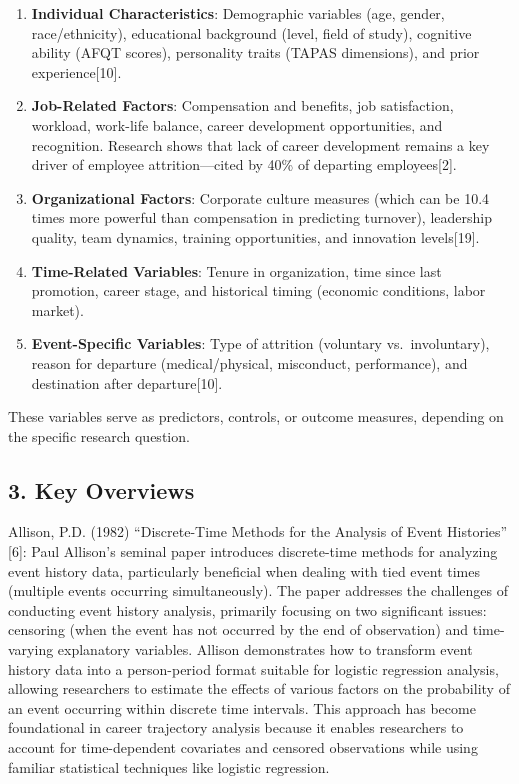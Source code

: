 \documentclass[./main.tex]{subfiles}
\begin{document}
\begin{enumerate}
\def\labelenumi{\arabic{enumi}.}
\item
  \textbf{Individual Characteristics}: Demographic variables (age,
  gender, race/ethnicity), educational background (level, field of
  study), cognitive ability (AFQT scores), personality traits (TAPAS
  dimensions), and prior experience{[}10{]}.
\item
  \textbf{Job-Related Factors}: Compensation and benefits, job
  satisfaction, workload, work-life balance, career development
  opportunities, and recognition. Research shows that lack of career
  development remains a key driver of employee attrition---cited by 40\%
  of departing employees{[}2{]}.
\item
  \textbf{Organizational Factors}: Corporate culture measures (which can
  be 10.4 times more powerful than compensation in predicting turnover),
  leadership quality, team dynamics, training opportunities, and
  innovation levels{[}19{]}.
\item
  \textbf{Time-Related Variables}: Tenure in organization, time since
  last promotion, career stage, and historical timing (economic
  conditions, labor market).
\item
  \textbf{Event-Specific Variables}: Type of attrition (voluntary
  vs.~involuntary), reason for departure (medical/physical, misconduct,
  performance), and destination after departure{[}10{]}.
\end{enumerate}

These variables serve as predictors, controls, or outcome measures,
depending on the specific research question.

\subsection{3. Key Overviews}\label{key-overviews}

Allison, P.D. (1982) ``Discrete-Time Methods for the Analysis of Event
Histories'' {[}6{]}: Paul Allison's seminal paper introduces
discrete-time methods for analyzing event history data, particularly
beneficial when dealing with tied event times (multiple events occurring
simultaneously). The paper addresses the challenges of conducting event
history analysis, primarily focusing on two significant issues:
censoring (when the event has not occurred by the end of observation)
and time-varying explanatory variables. Allison demonstrates how to
transform event history data into a person-period format suitable for
logistic regression analysis, allowing researchers to estimate the
effects of various factors on the probability of an event occurring
within discrete time intervals. This approach has become foundational in
career trajectory analysis because it enables researchers to account for
time-dependent covariates and censored observations while using familiar
statistical techniques like logistic regression.
\end{document}
